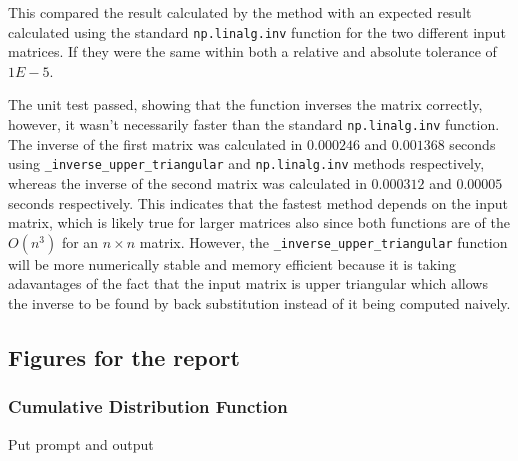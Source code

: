 \documentclass[12pt]{article}
\begin{document}
    This compared the result calculated by the method with an expected result calculated using the standard \texttt{np.linalg.inv} function for the two different input matrices.
    If they were the same within both a relative and absolute tolerance of $1E-5.$

    The unit test passed, showing that the function inverses the matrix correctly, however, it wasn't necessarily faster than the standard \texttt{np.linalg.inv} function.
    The inverse of the first matrix was calculated in $0.000246$ and $0.001368$ seconds using \texttt{\_inverse\_upper\_triangular} and \texttt{np.linalg.inv} methods respectively, whereas the inverse of the second matrix was calculated in $0.000312$ and $0.00005$ seconds respectively.
    This indicates that the fastest method depends on the input matrix, which is likely true for larger matrices also since both functions are of the $O(n^3)$ for an $n \times n$ matrix.
    However, the \texttt{\_inverse\_upper\_triangular} function will be more numerically stable and memory efficient because it is taking adavantages of the fact that the input matrix is upper triangular which allows the inverse to be found by back substitution instead of it being computed naively.
    \FloatBarrier

    \subsection{Figures for the report}
    \subsubsection{Cumulative Distribution Function}
    Put prompt and output


    \printbibliography
\end{document}
